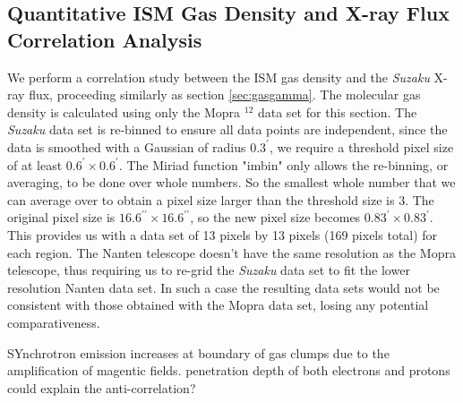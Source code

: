 \documentclass[12pt,a4paper]{article}
\begin{document}
\subsection{Quantitative ISM Gas Density and X-ray Flux Correlation Analysis}
We perform a correlation study between the ISM gas density and the \textit{Suzaku} X-ray flux, proceeding similarly as section \ref{sec:gasgamma}. The molecular gas density is calculated using only the Mopra $^{12}$ data set for this section. The \textit{Suzaku} data set is re-binned to ensure all data points are independent, since the data is smoothed with a Gaussian of radius $0.3^{\prime}$, we require a threshold pixel size of at least $0.6^{\prime} \times 0.6^{\prime} $. The Miriad function "imbin" only allows the re-binning, or averaging, to be done over whole numbers. So the smallest whole number that we can average over to obtain a pixel size larger than the threshold size is 3. The original pixel size is $16.6^{\prime \prime} \times 16.6^{\prime \prime}$, so the new pixel size becomes $0.83^{\prime} \times 0.83^{\prime}$. This provides us with a data set of 13 pixels by 13 pixels (169 pixels total) for each region. 
The Nanten telescope doesn't have the same resolution as the Mopra telescope, thus requiring us to re-grid the \textit{Suzaku} data set to fit the lower resolution Nanten data set. In such a case the resulting data sets would not be consistent with those obtained with the Mopra data set, losing any potential comparativeness. 

SYnchrotron emission increases at boundary of gas clumps due to the amplification of magentic fields.
penetration depth of both electrons and protons could explain the anti-correlation?
\end{document}
